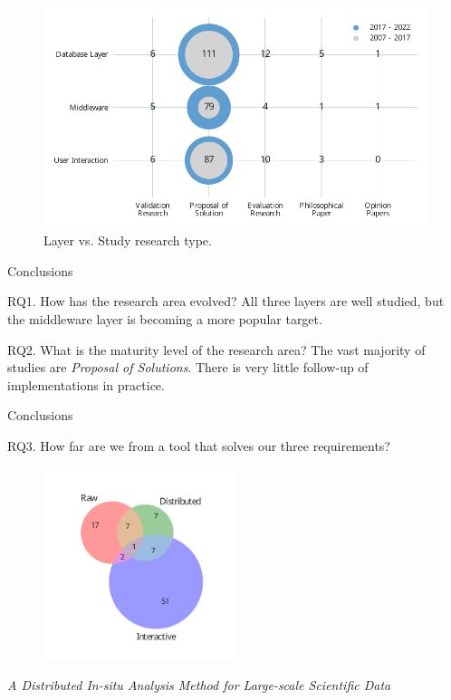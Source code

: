 \documentclass[10pt,notes]{beamer}
\begin{document}
\begin{frame}{}
\begin{figure}
    \centering
    \includegraphics[width=\textwidth]{layer_vs_type.pdf}
    \caption{Layer vs. Study research type.}
\end{figure}
\end{frame}

\begin{frame}{Conclusions}
    \begin{block}{RQ1. How has the research area evolved?}
        \smallskip
        All three layers are well studied, but the middleware layer is becoming a more popular target.
    \end{block}
    \begin{block}{RQ2. What is the maturity level of the research area?}
        \smallskip
        The vast majority of studies are \emph{Proposal of Solutions}. There is very little follow-up of implementations in practice.
    \end{block}
\end{frame}

\begin{frame}{Conclusions}
    \begin{block}{RQ3. How far are we from a tool that solves our three requirements?}
        \begin{figure}
            \centering
            \includegraphics[width=0.5\textwidth]{venn.pdf}
        \end{figure}
        \emph{{A} {D}istributed {I}n-situ {A}nalysis {M}ethod for {L}arge-scale
{S}cientific {D}ata}~\cite{Han2017}
    \end{block}

\end{frame}
\end{document}
